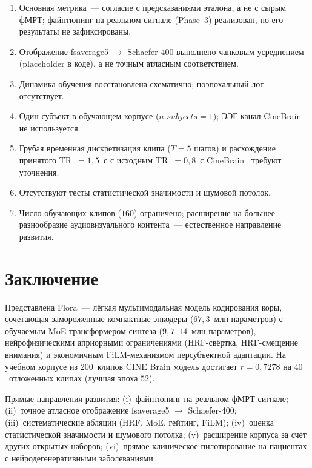\documentclass[11pt,a4paper]{article}
\begin{document}
\begin{enumerate}[label=(\arabic*), leftmargin=*]
    \item Основная метрика~--- согласие с предсказаниями эталона,
          а не с сырым фМРТ; файнтюнинг на реальном сигнале
          (Phase~$3$) реализован, но его результаты не зафиксированы.
    \item Отображение fsaverage5 $\rightarrow$ Schaefer-400
          выполнено чанковым усреднением (placeholder в коде),
          а не точным атласным соответствием.
    \item Динамика обучения восстановлена схематично; поэпохальный
          лог отсутствует.
    \item Один субъект в обучающем корпусе ($n\_subjects = 1$);
          ЭЭГ-канал CineBrain не используется.
    \item Грубая временная дискретизация клипа ($T = 5$ шагов)
          и расхождение принятого TR~$=1{,}5$~с с исходным
          TR~$=0{,}8$~с CineBrain~\cite{Gao2025cinebrain}
          требуют уточнения.
    \item Отсутствуют тесты статистической значимости и шумовой
          потолок.
    \item Число обучающих клипов ($160$) ограничено; расширение
          на большее разнообразие аудиовизуального контента~---
          естественное направление развития.
\end{enumerate}

\section{Заключение}
\label{sec:conclusion}

Представлена Flora~--- лёгкая мультимодальная модель кодирования
коры, сочетающая замороженные компактные энкодеры ($67{,}3$~млн
параметров) с обучаемым MoE-трансформером синтеза
($9{,}7$--$14$~млн параметров), нейрофизическими априорными
ограничениями (HRF-свёртка, HRF-смещение внимания) и экономичным
FiLM-механизмом персубъектной адаптации. На учебном корпусе
из $200$~клипов CINE Brain модель достигает $r = 0{,}7278$ на
$40$~отложенных клипах (лучшая эпоха $52$).

Прямые направления развития:
(i)~файнтюнинг на реальном фМРТ-сигнале;
(ii)~точное атласное отображение fsaverage5 $\rightarrow$
Schaefer-400;
(iii)~систематические абляции (HRF, MoE, гейтинг, FiLM);
(iv)~оценка статистической значимости и шумового потолка;
(v)~расширение корпуса за счёт других открытых наборов;
(vi)~прямое клиническое пилотирование на пациентах с
нейродегенеративными заболеваниями.
\end{document}
